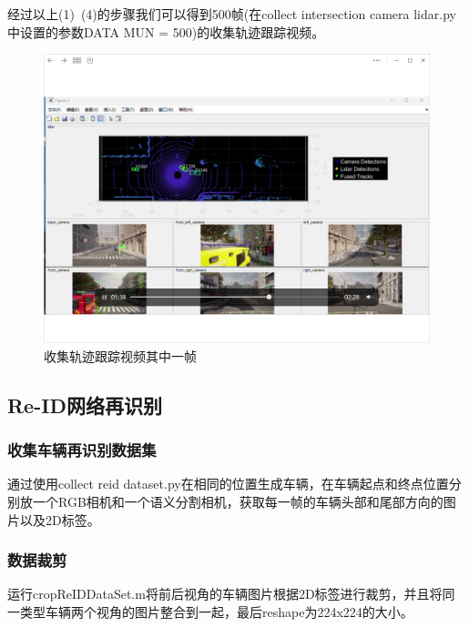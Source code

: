 经过以上(1)~(4)的步骤我们可以得到500帧(在collect intersection camera lidar.py中设置的参数DATA MUN = 500)的收集轨迹跟踪视频。



\begin{figure}[htbp] %
	\centering
	\includegraphics[width=1\textwidth]{p13} %
	\caption{收集轨迹跟踪视频其中一帧} %
	\label{fig:p13} %
\end{figure}







\subsection{Re-ID网络再识别}
\subsubsection{收集车辆再识别数据集}
通过使用collect reid dataset.py在相同的位置生成车辆，在车辆起点和终点位置分别放一个RGB相机和一个语义分割相机，获取每一帧的车辆头部和尾部方向的图片以及2D标签。
\subsubsection{数据裁剪}
运行cropReIDDataSet.m将前后视角的车辆图片根据2D标签进行裁剪，并且将同一类型车辆两个视角的图片整合到一起，最后reshape为224x224的大小。



